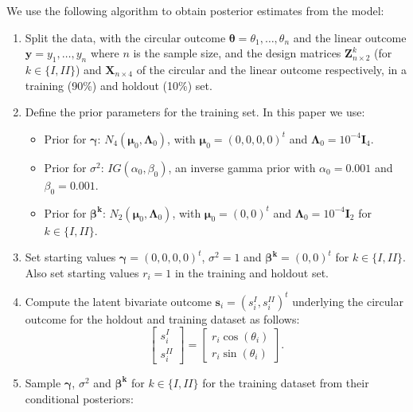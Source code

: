 \documentclass[12pt,]{article}
\begin{document}
We use the following algorithm to obtain posterior estimates from the
model:

\begin{enumerate}
\item Split the data, with the circular outcome $\boldsymbol{\theta} = \theta_1, \dots, \theta_n$ and the linear outcome $\boldsymbol{y} = y_1, \dots, y_n$ where $n$ is the sample size, and the design matrices $\boldsymbol{Z}^k_{n \times 2}$ (for $k \in \{I,II\}$) and $\boldsymbol{X}_{n \times 4}$ of the circular and the linear outcome respectively, in a training (90\%) and holdout (10\%) set. 
\item Define the prior parameters for the training set. In this paper we use:

\begin{itemize}
\item Prior for $\boldsymbol{\gamma}$: $N_4(\boldsymbol{\mu}_{0}, \boldsymbol{\Lambda}_{0})$, with  $\boldsymbol{\mu}_{0} = (0,0,0,0)^t$ and  $\boldsymbol{\Lambda}_{0} = 10^{-4}\boldsymbol{I}_4$.
\item Prior for $\sigma^2$: $IG(\alpha_{0}, \beta_{0})$, an inverse gamma prior with $\alpha_{0} = 0.001$ and  $\beta_{0} = 0.001$.
\item Prior for $\boldsymbol{\beta^{k}}$: $N_2(\boldsymbol{\mu}_{0}, \boldsymbol{\Lambda}_{0})$, with $\boldsymbol{\mu}_{0} = (0,0)^t$ and  $\boldsymbol{\Lambda}_{0} = 10^{-4}\boldsymbol{I}_2$ for $k \in \{I,II\}$.
\end{itemize}

\item Set starting values $\boldsymbol{\gamma} = (0,0,0,0)^t$, $\sigma^2 = 1$ and $\boldsymbol{\beta^{k}} = (0,0)^t$ for $k \in \{I,II\}$. Also set starting values $r_i = 1$ in the training and holdout set. 
\item Compute the latent bivariate outcome $\boldsymbol{s}_i = (s_i^{I}, s_i^{II})^t$ underlying the circular outcome for the holdout and training dataset as follows:
$$\begin{bmatrix} s^{I}_{i} \\ s^{II}_{i} \end{bmatrix} = \begin{bmatrix} r_i \cos (\theta_i)\\  r_i\sin (\theta_i)\end{bmatrix}.$$
\item Sample $\boldsymbol{\gamma}$, $\sigma^2$ and $\boldsymbol{\beta^{k}}$ for $k \in \{I,II\}$ for the training dataset from their conditional posteriors:


\end{enumerate}
\end{document}
